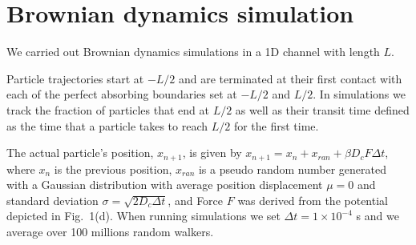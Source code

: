 \documentclass[
 reprint,
 aps, showkeys, showpacs
]{revtex4-1}
\begin{document}
\section{Brownian dynamics simulation}\label{appendix6}
We carried out Brownian dynamics simulations in a 1D channel with length $L$. 

Particle trajectories start at $-L/2$ and are terminated at their first contact with each of the perfect absorbing boundaries set at $-L/2$ and $L/2$. In simulations we track the fraction of particles that end at $L/2$ as well as their transit time defined as the time that a particle takes to reach $L/2$ for the first time. 

The actual particle's position, $x_{n+1}$, is given by $x_{n+1}= x_n + x_{ran} + \beta D_c F \Delta t$, where $x_n$ is the previous position, $x_{ran}$ is a pseudo random number generated with a Gaussian distribution with average position displacement $\mu = 0$ and standard deviation $\sigma = \sqrt{2 D_c \Delta t}$, and Force $F$ was derived from the potential depicted in Fig.~1(d). When running simulations we set $\Delta t = 1\times 10^{-4}$ s and we average over 100 millions random walkers. 

\newpage

\newpage
\end{document}
